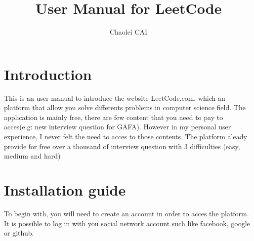 \documentclass[12pt, letterpaper]{article}
\title{User Manual for LeetCode}
\author{Chaolei CAI}
\begin{document}
\begin{titlepage}
    \maketitle
\end{titlepage}

\tableofcontents
\section{Introduction}
This is an user manual to introduce the website LeetCode.com, which an platform that allow you solve differents problems in computer science field. The application is mainly free, there are few content that you need to pay to acces(e.g: new interview question for GAFA). However in my personal user experience, I never felt the need to acces to those contents. The platform aleady provide for free over a thousand of interview question with 3 difficulties (easy, medium and hard)



\section{Installation guide}
To begin with, you will need to create an account in order to acces the platform. It is possible to log in with you social network account such like facebook, google or github.
\end{document}
